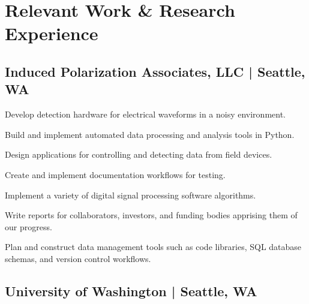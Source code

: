 \documentclass[letterpaper]{deedy-resume} %
\begin{document}
\begin{minipage}[t]{0.65\textwidth} %


\section{Relevant Work \& Research Experience}

\subsection{Induced Polarization Associates, LLC | Seattle, WA}
\vspace{\topsep} %
\begin{tightitemize}
\item Develop detection hardware for  electrical waveforms in a noisy environment. 
\item Build and implement automated data processing and analysis tools in Python.
\item Design applications for controlling and detecting data from field devices.
\item Create and implement documentation workflows for testing.
\item Implement a variety of digital signal processing software algorithms. 
\item Write reports for collaborators, investors, and funding bodies apprising them of our progress.
\item Plan and construct data management tools such as code libraries, SQL database schemas, and version control workflows. 
\end{tightitemize}
\sectionspace 

\subsection{University of Washington | Seattle, WA}


\end{minipage}
\end{document}
